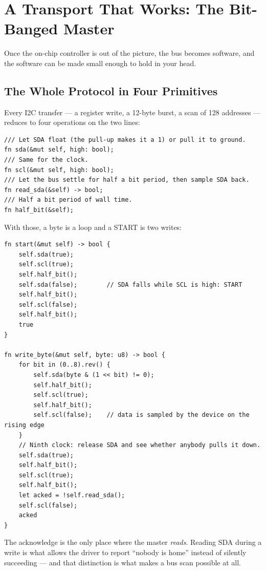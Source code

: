 \section{A Transport That Works: The Bit-Banged Master}
\label{sec:i2c-bitbang}

Once the on-chip controller is out of the picture, the bus becomes software, and the
software can be made small enough to hold in your head.

\subsection{The Whole Protocol in Four Primitives}

Every I2C transfer — a register write, a 12-byte burst, a scan of 128 addresses — reduces
to four operations on the two lines:

\begin{verbatim}
/// Let SDA float (the pull-up makes it a 1) or pull it to ground.
fn sda(&mut self, high: bool);
/// Same for the clock.
fn scl(&mut self, high: bool);
/// Let the bus settle for half a bit period, then sample SDA back.
fn read_sda(&self) -> bool;
/// Half a bit period of wall time.
fn half_bit(&self);
\end{verbatim}

With those, a byte is a loop and a START is two writes:

\begin{verbatim}
fn start(&mut self) -> bool {
    self.sda(true);
    self.scl(true);
    self.half_bit();
    self.sda(false);        // SDA falls while SCL is high: START
    self.half_bit();
    self.scl(false);
    self.half_bit();
    true
}

fn write_byte(&mut self, byte: u8) -> bool {
    for bit in (0..8).rev() {
        self.sda(byte & (1 << bit) != 0);
        self.half_bit();
        self.scl(true);
        self.half_bit();
        self.scl(false);    // data is sampled by the device on the rising edge
    }
    // Ninth clock: release SDA and see whether anybody pulls it down.
    self.sda(true);
    self.half_bit();
    self.scl(true);
    self.half_bit();
    let acked = !self.read_sda();
    self.scl(false);
    acked
}
\end{verbatim}

\begin{tipbox}
    The acknowledge is the only place where the master \emph{reads}. Reading SDA during a
    write is what allows the driver to report ``nobody is home'' instead of silently
    succeeding — and that distinction is what makes a bus scan possible at all.
\end{tipbox}

